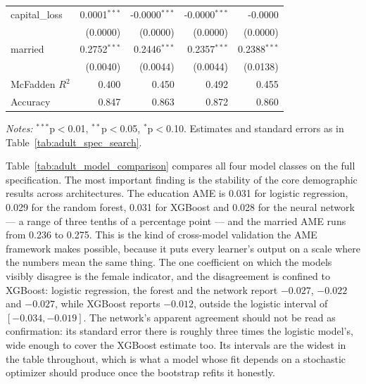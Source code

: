 \documentclass[conference]{IEEEtran}
\begin{document}
\begin{table}[htbp]
\begin{threeparttable}
\begin{tabular}{lrrrr}
				capital\_loss & 0.0001$^{***}$ & -0.0000$^{***}$ & -0.0000$^{***}$ & -0.0000 \\
				& (0.0000) & (0.0000) & (0.0000) & (0.0000) \\
				married & 0.2752$^{***}$ & 0.2446$^{***}$ & 0.2357$^{***}$ & 0.2388$^{***}$ \\
				& (0.0040) & (0.0044) & (0.0044) & (0.0138) \\
				\midrule
				McFadden $R^2$ & 0.400 & 0.450 & 0.492 & 0.455 \\
				Accuracy & 0.847 & 0.863 & 0.872 & 0.860 \\
				\bottomrule
				\end{tabular}
				\begin{tablenotes}
				\footnotesize
				\item \textit{Notes:} $^{***}$p$<$0.01, $^{**}$p$<$0.05, $^{*}$p$<$0.10. Estimates and standard errors as in Table~\ref{tab:adult_spec_search}.
				\end{tablenotes}
		\end{threeparttable}
	\end{table}
	
	Table~\ref{tab:adult_model_comparison} compares all four model classes on the full specification. The most important finding is the stability of the core demographic results across architectures. The education AME is 0.031 for logistic regression, 0.029 for the random forest, 0.031 for XGBoost and 0.028 for the neural network --- a range of three tenths of a percentage point --- and the married AME runs from 0.236 to 0.275. This is the kind of cross-model validation the AME framework makes possible, because it puts every learner's output on a scale where the numbers mean the same thing. The one coefficient on which the models visibly disagree is the female indicator, and the disagreement is confined to XGBoost: logistic regression, the forest and the network report $-0.027$, $-0.022$ and $-0.027$, while XGBoost reports $-0.012$, outside the logistic interval of $[-0.034, -0.019]$. The network's apparent agreement should not be read as confirmation: its standard error there is roughly three times the logistic model's, wide enough to cover the XGBoost estimate too. Its intervals are the widest in the table throughout, which is what a model whose fit depends on a stochastic optimizer should produce once the bootstrap refits it honestly.
	
\end{document}
